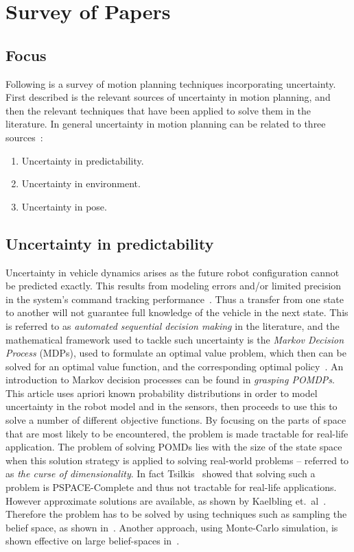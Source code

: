 \chapter{Survey of Papers}
\label{chp:survey-of-papers}

\section{Focus}
Following is a survey of motion planning techniques incorporating uncertainty.
First described is the relevant sources of uncertainty in motion planning, and
then the relevant techniques that have been applied to solve them in the
literature. In general uncertainty in motion planning can be related to three
sources~\cite{lavalleFrameworkMotionPlanning1995}:
\begin{enumerate}
\item Uncertainty in predictability.
\item Uncertainty in environment.
\item Uncertainty in pose.
\end{enumerate}

\section{Uncertainty in predictability}
Uncertainty in vehicle dynamics arises as the future robot configuration cannot
be predicted exactly. This results from modeling errors and/or limited precision
in the system's command tracking
performance~\cite{dadkhahSurveyMotionPlanning2012}. Thus a transfer from one
state to another will not guarantee full knowledge of the vehicle in the next
state. This is referred to as \textit{automated sequential decision making} in
the literature, and the mathematical framework used to tackle such uncertainty
is the \textit{Markov Decision Process} (MDPs), used to formulate an optimal
value problem, which then can be solved for an optimal value function, and the
corresponding optimal policy~\cite{Cassandra:1998:EAA:926710}. An introduction
to Markov decision processes can be found in \textit{grasping
  POMDPs}\cite{kaelblingPlanningActingPartially1998}. This article uses apriori
known probability distributions in order to model uncertainty in the robot model
and in the sensors, then proceeds to use this to solve a number of different
objective functions. By focusing on the parts of space that are most likely to
be encountered, the problem is made tractable for real-life application. The
problem of solving POMDs lies with the size of the state space when this
solution strategy is applied to solving real-world problems -- referred to as
\textit{the curse of dimensionality}. In fact
Tsilkis~\cite{christosh.papadimitriouComplexityMarkovDecision1987} showed that
solving such a problem is PSPACE-Complete and thus not tractable for real-life
applications. However approximate solutions are available, as shown by Kaelbling
et.\ al~\cite{kaelblingPlanningActingPartially1998}. Therefore the problem has
to be solved by using techniques such as sampling the belief space, as shown
in~\cite{kearns2002sparse}. Another approach, using Monte-Carlo simulation, is
shown effective on large belief-spaces in~\cite{Veness_2011}.

